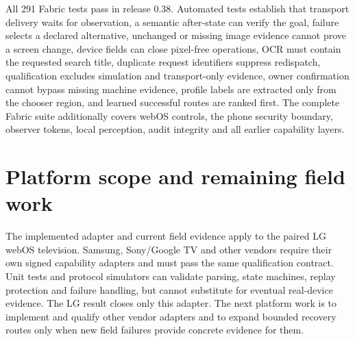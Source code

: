 \documentclass[11pt,a4paper]{article}
\begin{document}
All 291 Fabric tests pass in release 0.38.  Automated tests establish that
transport delivery waits for observation, a
semantic after-state can verify the goal, failure selects a declared alternative,
unchanged or missing image evidence cannot prove a screen change, device fields
can close pixel-free operations, OCR must contain the requested search title,
duplicate request identifiers suppress redispatch, qualification excludes
simulation and transport-only evidence, owner confirmation cannot bypass missing
machine evidence, profile labels are extracted only from the chooser region, and
learned successful routes are ranked first.
The complete Fabric suite additionally covers webOS controls, the phone security
boundary, observer tokens, local perception, audit integrity and all earlier
capability layers.

\section{Platform scope and remaining field work}

The implemented adapter and current field evidence apply to the paired LG webOS
television.  Samsung, Sony/Google TV and other vendors require their own signed
capability adapters and must pass the same qualification contract.  Unit tests
and protocol simulators can validate parsing, state machines, replay protection
and failure handling, but cannot substitute for eventual real-device evidence.
The LG result closes only this adapter. The next platform work is to implement and
qualify other vendor adapters and to expand bounded recovery routes only when new
field failures provide concrete evidence for them.
\end{document}
